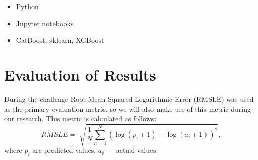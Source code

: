 \documentclass[11pt,a4paper]{article}
\begin{document}
	\begin{itemize}
		\setlength{\parskip}{0pt}
		\item Python
		\item Jupyter notebooks
		\item CatBoost, sklearn, XGBoost
	\end{itemize}
	
	
	\section{Evaluation of Results}
	During the challenge Root Mean Squared Logarithmic Error (RMSLE) was used as the primary evaluation metric, so we will also make use of this metric during our research. This metric is calculated as follows:
	$$ RMSLE = \sqrt[]{\frac{1}{N}\sum_{n = 1}^N (\log(p_i + 1) - \log(a_i + 1))^2}, $$
	where $p_i$ are predicted values, $a_i$ --- actual values.
\end{document}

